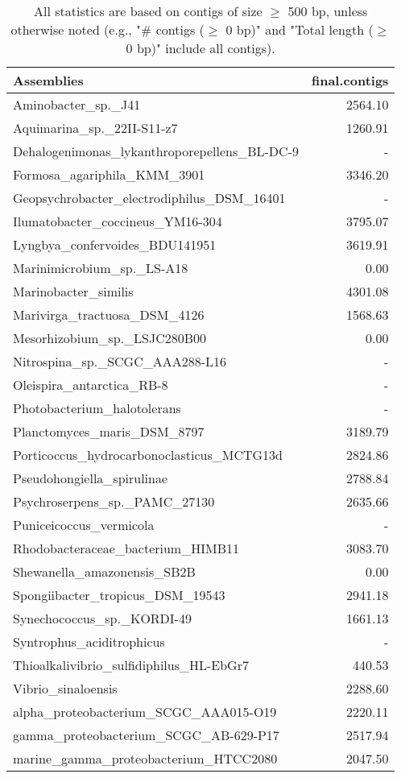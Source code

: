 \documentclass[12pt,a4paper]{article}
\begin{document}
\begin{table}[ht]
\begin{center}
\caption{All statistics are based on contigs of size $\geq$ 500 bp, unless otherwise noted (e.g., "\# contigs ($\geq$ 0 bp)" and "Total length ($\geq$ 0 bp)" include all contigs).}
\begin{tabular}{|l*{1}{|r}|}
\hline
Assemblies & final.contigs \\ \hline
Aminobacter\_sp.\_J41 & 2564.10 \\ \hline
Aquimarina\_sp.\_22II-S11-z7 & 1260.91 \\ \hline
Dehalogenimonas\_lykanthroporepellens\_BL-DC-9 & - \\ \hline
Formosa\_agariphila\_KMM\_3901 & 3346.20 \\ \hline
Geopsychrobacter\_electrodiphilus\_DSM\_16401 & - \\ \hline
Ilumatobacter\_coccineus\_YM16-304 & 3795.07 \\ \hline
Lyngbya\_confervoides\_BDU141951 & 3619.91 \\ \hline
Marinimicrobium\_sp.\_LS-A18 & 0.00 \\ \hline
Marinobacter\_similis & 4301.08 \\ \hline
Marivirga\_tractuosa\_DSM\_4126 & 1568.63 \\ \hline
Mesorhizobium\_sp.\_LSJC280B00 & 0.00 \\ \hline
Nitrospina\_sp.\_SCGC\_AAA288-L16 & - \\ \hline
Oleispira\_antarctica\_RB-8 & - \\ \hline
Photobacterium\_halotolerans & - \\ \hline
Planctomyces\_maris\_DSM\_8797 & 3189.79 \\ \hline
Porticoccus\_hydrocarbonoclasticus\_MCTG13d & 2824.86 \\ \hline
Pseudohongiella\_spirulinae & 2788.84 \\ \hline
Psychroserpens\_sp.\_PAMC\_27130 & 2635.66 \\ \hline
Puniceicoccus\_vermicola & - \\ \hline
Rhodobacteraceae\_bacterium\_HIMB11 & 3083.70 \\ \hline
Shewanella\_amazonensis\_SB2B & 0.00 \\ \hline
Spongiibacter\_tropicus\_DSM\_19543 & 2941.18 \\ \hline
Synechococcus\_sp.\_KORDI-49 & 1661.13 \\ \hline
Syntrophus\_aciditrophicus & - \\ \hline
Thioalkalivibrio\_sulfidiphilus\_HL-EbGr7 & 440.53 \\ \hline
Vibrio\_sinaloensis & 2288.60 \\ \hline
alpha\_proteobacterium\_SCGC\_AAA015-O19 & 2220.11 \\ \hline
gamma\_proteobacterium\_SCGC\_AB-629-P17 & 2517.94 \\ \hline
marine\_gamma\_proteobacterium\_HTCC2080 & 2047.50 \\ \hline
\end{tabular}
\end{center}
\end{table}
\end{document}
